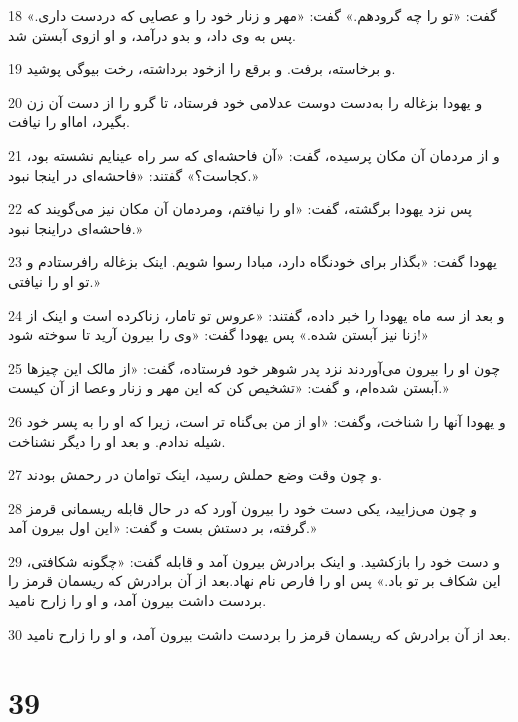 \par 18 گفت: «تو را چه گرودهم.» گفت: «مهر و زنار خود را و عصایی که دردست داری.» پس به وی داد، و بدو درآمد، و او ازوی آبستن شد.
\par 19 و برخاسته، برفت. و برقع را ازخود برداشته، رخت بیوگی پوشید.
\par 20 و یهودا بزغاله را به‌دست دوست عدلامی خود فرستاد، تا گرو را از دست آن زن بگیرد، امااو را نیافت.
\par 21 و از مردمان آن مکان پرسیده، گفت: «آن فاحشه‌ای که سر راه عینایم نشسته بود، کجاست؟» گفتند: «فاحشه‌ای در اینجا نبود.»
\par 22 پس نزد یهودا برگشته، گفت: «او را نیافتم، ومردمان آن مکان نیز می‌گویند که فاحشه‌ای دراینجا نبود.»
\par 23 یهودا گفت: «بگذار برای خودنگاه دارد، مبادا رسوا شویم. اینک بزغاله رافرستادم و تو او را نیافتی.»
\par 24 و بعد از سه ماه یهودا را خبر داده، گفتند: «عروس تو تامار، زناکرده است و اینک از زنا نیز آبستن شده.» پس یهودا گفت: «وی را بیرون آرید تا سوخته شود!»
\par 25 چون او را بیرون می‌آوردند نزد پدر شوهر خود فرستاده، گفت: «از مالک این چیزها آبستن شده‌ام، و گفت: «تشخیص کن که این مهر و زنار وعصا از آن کیست.»
\par 26 و یهودا آنها را شناخت، وگفت: «او از من بی‌گناه تر است، زیرا که او را به پسر خود شیله ندادم. و بعد او را دیگر نشناخت.
\par 27 و چون وقت وضع حملش رسید، اینک توامان در رحمش بودند.
\par 28 و چون می‌زایید، یکی دست خود را بیرون آورد که در حال قابله ریسمانی قرمز گرفته، بر دستش بست و گفت: «این اول بیرون آمد.»
\par 29 و دست خود را بازکشید. و اینک برادرش بیرون آمد و قابله گفت: «چگونه شکافتی، این شکاف بر تو باد.» پس او را فارص نام نهاد.بعد از آن برادرش که ریسمان قرمز را بردست داشت بیرون آمد، و او را زارح نامید.
\par 30 بعد از آن برادرش که ریسمان قرمز را بردست داشت بیرون آمد، و او را زارح نامید.
 
\chapter{39}

